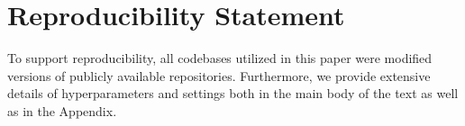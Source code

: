 \section{Reproducibility Statement}
 To support reproducibility, all codebases utilized in this paper were modified versions of publicly available repositories.  Furthermore, we provide extensive details of hyperparameters and settings both in the main body of the text as well as in the Appendix.






